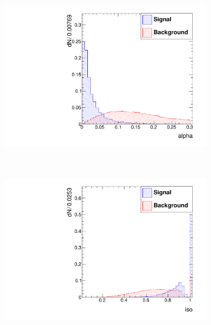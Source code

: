 \documentclass[10pt,a4paper]{article}
\begin{document}
\begin{figure}
        \begin{subfigure}[b]{0.2\textwidth}
                \centering
                \includegraphics[width=\textwidth]{Figures/alpha_endcaps}
                \label{fig:alphaEndcaps}
        \end{subfigure}
        ~
        \begin{subfigure}[b]{0.2\textwidth}
                \centering
                \includegraphics[width=\textwidth]{Figures/iso_endcaps}
                \label{fig:isoEndcaps}
        \end{subfigure}
        ~
        \begin{subfigure}[b]{0.2\textwidth}
                \centering

\end{subfigure}
\end{figure}
\end{document}
